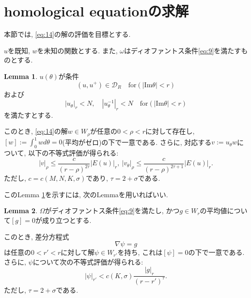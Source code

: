 \documentclass[a4paper]{ujarticle}
\numberwithin{equation}{section}
\theoremstyle{definition}
\newtheorem{lemma}{Lemma}
\begin{document}
        \section{homological equationの求解}
        本節では, \eqref{eq:14}の解の評価を目標とする.
        
        $u$を既知, $w$を未知の関数とする. また, $\omega$はディオファントス条件\eqref{eq:9}を満たすものとする.
        \begin{lemma} \label{lem:8}
            $u(\theta)$が条件
            \begin{equation} \label{eq:16}
                (u, u^{+}) \in \mathcal{D}_{R} \quad \text{for} (|\mathrm{Im} \theta| < r)
            \end{equation}
            および
            \begin{equation} \label{eq:17}
                |u_{\theta}|_r < N, \quad |u^{-1}_{\theta}|_r < N \quad \text{for} (|\mathrm{Im} \theta| < r)
            \end{equation}
            を満たすとする. 
            
            このとき, \eqref{eq:14}の解$w \in W_{\rho}$が任意の$0 < \rho < r$に対して存在し, $\displaystyle [w] := \int^{1}_{0} w d \theta = 0$(平均がゼロ)の下で一意である.
            さらに, 対応する$v := u_{\theta} w$について, 以下の不等式評価が得られる:
            \begin{equation} \label{eq:18}
                |v|_{\rho} \leq \frac{c}{(r - \rho)^{2 \tau}} |E(u)|_{r}, \ |v_{\theta}|_{\rho} \leq \frac{c}{(r - \rho)^{2 \tau + 1}} |E(u)|_{r}.
            \end{equation}
            ただし, $c = c(M ,N, K, \sigma)$であり, $\tau = 2 + \sigma$である.
        \end{lemma}

        このLemma \ref{lem:8}を示すには, 次のLemmaを用いればいい.
        \begin{lemma} \label{lem:9}
            $\Omega$がディオファントス条件\eqref{eq:9}を満たし, かつ$g \in W_r$の平均値について$[g] = 0$が成り立つとする.

            このとき, 差分方程式
            \begin{equation} \label{eq:19}
                \nabla \psi = g
            \end{equation}
            は任意の$0 < r' < r$に対して解$\psi \in W_{r'}$を持ち, これは$[\psi] = 0$の下で一意である.
            さらに, $\psi$について次の不等式評価が得られる:
            \begin{equation} \label{eq:20}
                |\psi|_{r'} < c(K, \sigma) \frac{|g|_{r}}{(r - r')^{\tau}}.
            \end{equation}
            ただし, $\tau = 2 + \sigma$である.
        \end{lemma}
\end{document}
